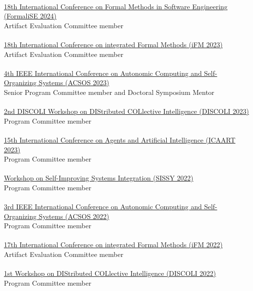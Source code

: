 \halfblankline \\
\href{https://formalise2024.github.io/}{18th International Conference on Formal Methods in Software Engineering (FormaliSE 2024)}
\\ Artifact Evaluation Committee member \\
\halfblankline \\
\href{https://liacs.leidenuniv.nl/~bonsanguemm/ifm23/}{18th International Conference on integrated Formal Methods
(iFM 2023)}
\\ Artifact Evaluation Committee member \\
\halfblankline \\
\href{https://2023.acsos.org/}{4th IEEE International Conference on Autonomic Computing and Self-Organizing Systems (ACSOS 2023)}
\\ Senior Program Committee member and Doctoral Symposium Mentor \\
\halfblankline \\
\href{https://discoli-workshop.github.io/2023/}{2nd DISCOLI Workshop on DIStributed COLlective Intelligence (DISCOLI 2023)}
\\ Program Committee member \\
\halfblankline \\
\href{https://icaart.scitevents.org/}{15th International Conference on Agents and Artificial Intelligence
(ICAART 2023)}
\\ Program Committee member \\
\halfblankline \\
\href{https://sissy.telecom-paristech.fr/}{Workshop on Self-Improving Systems Integration (SISSY 2022)}
\\ Program Committee member \\
\halfblankline \\
\href{https://conf.researchr.org/home/acsos-2022/}{3rd IEEE International Conference on Autonomic Computing and Self-Organizing Systems
(ACSOS 2022)}
\\ Program Committee member \\
\halfblankline \\
\href{https://ifm22.si.usi.ch/}{17th International Conference on integrated Formal Methods
(iFM 2022)}
\\ Artifact Evaluation Committee member \\
\halfblankline \\
\href{https://discoli-workshop.github.io/2022/}{1st Workshop on DIStributed COLlective Intelligence
(DISCOLI 2022)}
\\ Program Committee member \\
